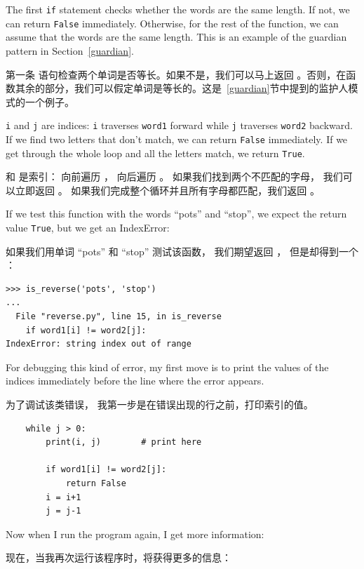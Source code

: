 %
The first {\tt if} statement checks whether the words are the
same length.  If not, we can return {\tt False} immediately.
Otherwise, for the rest of the function, we can assume that the words
are the same length.  This is an example of the guardian pattern
in Section~\ref{guardian}.
  

第一条  语句检查两个单词是否等长。如果不是，我们可以马上返回  。否则，在函数其余的部分，我们可以假定单词是等长的。这是~\ref{guardian}节中提到的监护人模式的一个例子。

{\tt i} and {\tt j} are indices: {\tt i} traverses {\tt word1}
forward while {\tt j} traverses {\tt word2} backward.  If we find
two letters that don't match, we can return {\tt False} immediately.
If we get through the whole loop and all the letters match, we
return {\tt True}.

 和  是索引： 向前遍历 ， 向后遍历 。 如果我们找到两个不匹配的字母， 我们可以立即返回 。 如果我们完成整个循环并且所有字母都匹配，我们返回  。

If we test this function with the words ``pots'' and ``stop'', we
expect the return value {\tt True}, but we get an IndexError:
  

如果我们用单词 ``pots'' 和 ``stop'' 测试该函数， 我们期望返回  ， 但是却得到一个 ：

\begin{lstlisting}
>>> is_reverse('pots', 'stop')
...
  File "reverse.py", line 15, in is_reverse
    if word1[i] != word2[j]:
IndexError: string index out of range
\end{lstlisting}

%
For debugging this kind of error, my first move is to
print the values of the indices immediately before the line
where the error appears.

为了调试该类错误， 我第一步是在错误出现的行之前，打印索引的值。

\begin{lstlisting}
    while j > 0:
        print(i, j)        # print here

        if word1[i] != word2[j]:
            return False
        i = i+1
        j = j-1
\end{lstlisting}

%
Now when I run the program again, I get more information:

现在，当我再次运行该程序时，将获得更多的信息：

